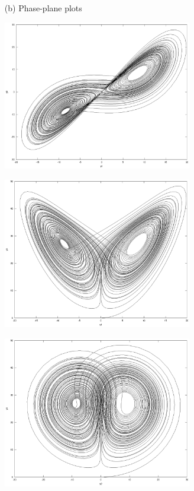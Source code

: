 \documentclass[11pt,a4paper]{article}
\begin{document}
\begin{enumerate}
	\item[(b)] Phase-plane plots 
	\begin{center}
		\includegraphics[width=0.65\textwidth]{pp1.eps}
	\end{center}
	\begin{center}
		\includegraphics[width=0.65\textwidth]{pp2.eps}
	\end{center}
	\begin{center}
		\includegraphics[width=0.65\textwidth]{pp3.eps}
	\end{center}
	

\end{enumerate}
\end{document}
